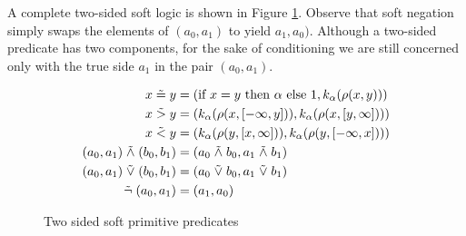 A complete two-sided soft logic is shown in Figure \ref{softw}.
Observe that soft negation simply swaps the elements of $(a_0, a_1)$ to yield $a_1, a_0)$.
Although a two-sided predicate has two components, for the sake of conditioning we are still concerned only with the true side $a_1$ in the pair $(a_0, a_1)$.




\begin{figure}\label{softw}
\begin{align*}
x \mathrel{\tilde{=}} y &= (\text{if } x = y  \text{ then } \alpha \text{ else } 1, k_\alpha(\rho(x, y)))\\
x \mathrel{\tilde{>}} y &= (k_\alpha(\rho(x, [-\infty, y])), k_\alpha(\rho(x, [y, \infty])))\\
x \mathrel{\tilde{<}} y &= (k_\alpha(\rho(y, [x, \infty])), k_\alpha(\rho(y, [-\infty, x])))\\
(a_0, a_1) \mathrel{\tilde{\land}} (b_0, b_1) &= (a_0 \mathrel{\tilde{\land}} b_0, a_1 \mathrel{\tilde{\land}} b_1)\\
(a_0, a_1) \mathrel{\tilde{\lor}} (b_0, b_1) &= (a_0 \mathrel{\tilde{\lor}} b_0, a_1 \mathrel{\tilde{\lor}} b_1)\\
\mathrel{\tilde{\neg}}(a_0, a_1) &= (a_1, a_0)
\end{align*}
\caption{Two sided soft primitive predicates}
\end{figure}




